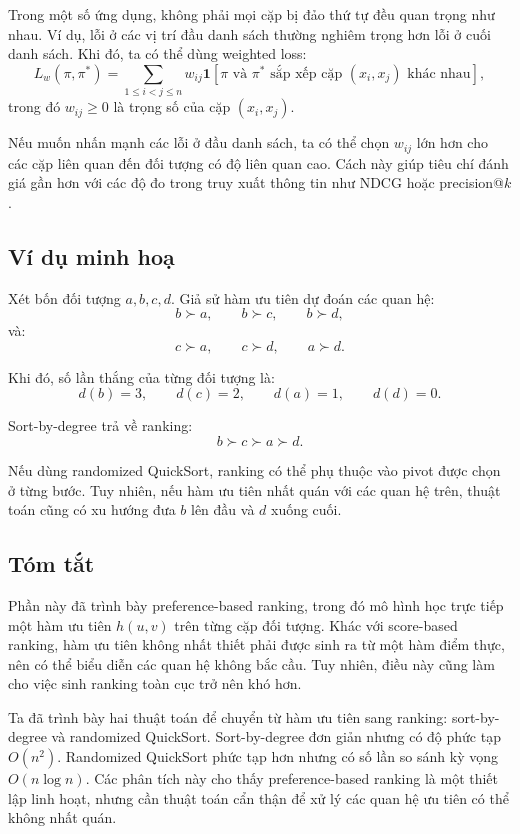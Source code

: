 Trong một số ứng dụng, không phải mọi cặp bị đảo thứ tự đều quan trọng như nhau. Ví dụ, lỗi ở các vị trí đầu danh sách thường nghiêm trọng hơn lỗi ở cuối danh sách. Khi đó, ta có thể dùng weighted loss:
\begin{equation}
    L_w(\pi,\pi^{*})
    =
    \sum_{1\leq i<j\leq n}
    w_{ij}
    \mathbf{1}
    \left[
        \pi \text{ và } \pi^{*}
        \text{ sắp xếp cặp } (x_i,x_j) \text{ khác nhau}
    \right],
    \label{eq:section7-weighted-loss}
\end{equation}
trong đó \(w_{ij}\geq 0\) là trọng số của cặp \((x_i,x_j)\).

Nếu muốn nhấn mạnh các lỗi ở đầu danh sách, ta có thể chọn \(w_{ij}\) lớn hơn cho các cặp liên quan đến đối tượng có độ liên quan cao. Cách này giúp tiêu chí đánh giá gần hơn với các độ đo trong truy xuất thông tin như NDCG hoặc precision@\(k\).

\subsection{Ví dụ minh hoạ}

Xét bốn đối tượng \(a,b,c,d\). Giả sử hàm ưu tiên dự đoán các quan hệ:
\[
    b\succ a,
    \qquad
    b\succ c,
    \qquad
    b\succ d,
\]
và:
\[
    c\succ a,
    \qquad
    c\succ d,
    \qquad
    a\succ d.
\]

Khi đó, số lần thắng của từng đối tượng là:
\[
    d(b)=3,
    \qquad
    d(c)=2,
    \qquad
    d(a)=1,
    \qquad
    d(d)=0.
\]

Sort-by-degree trả về ranking:
\[
    b\succ c\succ a\succ d.
\]

Nếu dùng randomized QuickSort, ranking có thể phụ thuộc vào pivot được chọn ở từng bước. Tuy nhiên, nếu hàm ưu tiên nhất quán với các quan hệ trên, thuật toán cũng có xu hướng đưa \(b\) lên đầu và \(d\) xuống cuối.

\subsection{Tóm tắt}

Phần này đã trình bày preference-based ranking, trong đó mô hình học trực tiếp một hàm ưu tiên \(h(u,v)\) trên từng cặp đối tượng. Khác với score-based ranking, hàm ưu tiên không nhất thiết phải được sinh ra từ một hàm điểm thực, nên có thể biểu diễn các quan hệ không bắc cầu. Tuy nhiên, điều này cũng làm cho việc sinh ranking toàn cục trở nên khó hơn.

Ta đã trình bày hai thuật toán để chuyển từ hàm ưu tiên sang ranking: sort-by-degree và randomized QuickSort. Sort-by-degree đơn giản nhưng có độ phức tạp \(O(n^2)\). Randomized QuickSort phức tạp hơn nhưng có số lần so sánh kỳ vọng \(O(n\log n)\). Các phân tích này cho thấy preference-based ranking là một thiết lập linh hoạt, nhưng cần thuật toán cẩn thận để xử lý các quan hệ ưu tiên có thể không nhất quán.